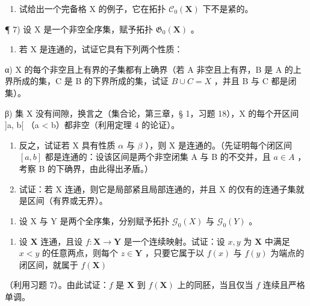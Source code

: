 \begin{enumerate}
\def\labelenumi{\alph{enumi})}
\setcounter{enumi}{1}
\tightlist
\item
试给出一个完备格 X 的例子，它在拓扑 \(\mathcal{C}_{0}(\mathbf{X})\) 下不是紧的。
\end{enumerate}

¶ 7) 设 X 是一个非空全序集，赋予拓扑 \(\mathfrak{G}_{\mathfrak{0}}(\mathbf{X})\) 。

\begin{enumerate}
\def\labelenumi{\alph{enumi})}
\tightlist
\item
若 X 是连通的，试证它具有下列两个性质：
\end{enumerate}

α) X 的每个非空且上有界的子集都有上确界（若 A 非空且上有界，B 是 A 的上界所成的集，C 是 B 的下界所成的集，试证 \(B \cup C = X\) ，并且 B 与 C 都是闭集）。

β) 集 X 没有间隙，换言之（集合论，第三章，§ 1，习题 18），X 的每个开区间 {]}a, b{[} （a \textless{} b）都非空（利用定理 4 的论证）。

\begin{enumerate}
\def\labelenumi{\alph{enumi})}
\setcounter{enumi}{1}
\item
反之，试证若 X 具有性质 \(\alpha\) 与 \(\beta\) ），则 X 是连通的。（先证明每个闭区间 \([a, b]\) 都是连通的：设该区间是两个非空闭集 A 与 B 的不交并，且 \(a \in A\) ，考察 B 的下确界，由此得出矛盾。）
\item
试证：若 X 连通，则它是局部紧且局部连通的，并且 X 的仅有的连通子集就是区间（有界或无界）。
\end{enumerate}

\begin{enumerate}
\def\labelenumi{\arabic{enumi})}
\setcounter{enumi}{7}
\tightlist
\item
设 X 与 Y 是两个全序集，分别赋予拓扑 \(\mathcal{G}_{0}(X)\) 与 \(\mathcal{G}_{0}(Y)\) 。
\end{enumerate}

\begin{enumerate}
\def\labelenumi{\alph{enumi})}
\tightlist
\item
设 \(\mathbf{X}\) 连通，且设 \(f: \mathbf{X} \to \mathbf{Y}\) 是一个连续映射。试证：设 \(x, y\) 为 \(\mathbf{X}\) 中满足 \(x < y\) 的任意两点，则每个 \(z \in \mathbf{Y}\) ，只要它属于以 \(f(x)\) 与 \(f(y)\) 为端点的闭区间，就属于 \(f(\mathbf{X})\)
\end{enumerate}

（利用习题 7）。由此试证：\(f\) 是 \(\mathbf{X}\) 到 \(f(\mathbf{X})\) 上的同胚，当且仅当 \(f\) 连续且严格单调。

